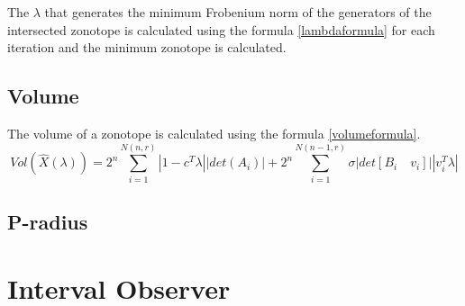 The $\lambda$ that generates the minimum Frobenium norm of the generators of the intersected zonotope is calculated using the formula \ref{lambdaformula} for each iteration and the minimum zonotope is calculated.

\subsection{Volume}
The volume of a zonotope is calculated using the formula \ref{volumeformula}.
\begin{equation}
\label{volumeformula}
Vol(\hat{X}(\lambda)) = 2^n \sum^{N(n,r)}_{i=1} |1- c^T \lambda||det(A_i)| + 2^n \sum^{N(n-1,r)}_{i=1} \sigma|det[B_i \quad v_i]||v_i^T\lambda|
\end{equation}

\subsection{P-radius}


\section{Interval Observer}
